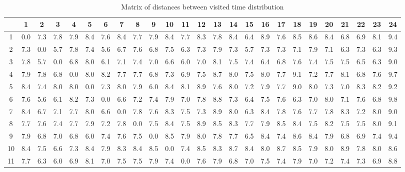 \begin{table}[htbp]
\footnotesize
\setlength{\tabcolsep}{2pt}
\caption{Matrix of distances between visited time distribution}
\label{Table:TimeDistance}
\centering
\begin{tabular}{c|cccccccccccccccccccccccc}
\hline
& 1 & 2 & 3 & 4 & 5 & 6 & 7 & 8 & 9 & 10 & 11 & 12 & 13 & 14 & 15 & 16 & 17 & 18 & 19 & 20 & 21 & 22 & 23 & 24 \\
\hline
1 & 0.0 & 7.3 & 7.8 & 7.9 & 8.4 & 7.6 & 8.4 & 7.7 & 7.9 & 8.4 & 7.7 & 8.3 & 7.8 & 8.4 & 6.4 & 8.9 & 7.6 & 8.5 & 8.6 & 8.4 & 6.8 & 6.9 & 8.1 & 9.4 \\
2 & 7.3 & 0.0 & 5.7 & 7.8 & 7.4 & 5.6 & 6.7 & 7.6 & 6.8 & 7.5 & 6.3 & 7.3 & 7.9 & 7.3 & 5.7 & 7.3 & 7.3 & 7.1 & 7.9 & 7.1 & 6.3 & 7.3 & 6.3 & 9.3 \\
3 & 7.8 & 5.7 & 0.0 & 6.8 & 8.0 & 6.1 & 7.1 & 7.4 & 7.0 & 6.6 & 6.0 & 7.0 & 8.1 & 7.5 & 7.4 & 6.4 & 6.8 & 7.6 & 7.4 & 7.5 & 7.5 & 6.5 & 6.3 & 9.0 \\
4 & 7.9 & 7.8 & 6.8 & 0.0 & 8.0 & 8.2 & 7.7 & 7.7 & 6.8 & 7.3 & 6.9 & 7.5 & 8.7 & 8.0 & 7.5 & 8.0 & 7.7 & 9.1 & 7.2 & 7.7 & 8.1 & 6.8 & 7.6 & 9.7 \\
5 & 8.4 & 7.4 & 8.0 & 8.0 & 0.0 & 7.3 & 8.0 & 7.9 & 6.0 & 8.4 & 8.1 & 8.9 & 7.6 & 8.0 & 7.2 & 7.9 & 7.7 & 9.0 & 8.0 & 7.3 & 7.0 & 8.3 & 8.2 & 9.2 \\
6 & 7.6 & 5.6 & 6.1 & 8.2 & 7.3 & 0.0 & 6.6 & 7.2 & 7.4 & 7.9 & 7.0 & 7.8 & 8.8 & 7.3 & 6.4 & 7.5 & 7.6 & 6.3 & 7.0 & 8.0 & 7.1 & 7.6 & 6.8 & 9.8 \\
7 & 8.4 & 6.7 & 7.1 & 7.7 & 8.0 & 6.6 & 0.0 & 7.8 & 7.6 & 8.3 & 7.5 & 7.3 & 8.9 & 8.0 & 6.3 & 8.4 & 7.8 & 7.6 & 7.7 & 7.8 & 8.3 & 7.2 & 8.0 & 9.0 \\
8 & 7.7 & 7.6 & 7.4 & 7.7 & 7.9 & 7.2 & 7.8 & 0.0 & 7.5 & 8.4 & 7.5 & 8.9 & 8.5 & 8.3 & 7.7 & 7.9 & 8.5 & 8.4 & 7.5 & 8.2 & 7.5 & 7.5 & 8.0 & 9.1 \\
9 & 7.9 & 6.8 & 7.0 & 6.8 & 6.0 & 7.4 & 7.6 & 7.5 & 0.0 & 8.5 & 7.9 & 8.0 & 7.8 & 7.7 & 6.5 & 8.4 & 7.4 & 8.6 & 8.4 & 7.9 & 6.8 & 6.9 & 7.4 & 9.4 \\
10 & 8.4 & 7.5 & 6.6 & 7.3 & 8.4 & 7.9 & 8.3 & 8.4 & 8.5 & 0.0 & 7.4 & 8.5 & 8.3 & 8.7 & 8.4 & 8.0 & 8.7 & 8.5 & 7.9 & 8.0 & 8.9 & 7.8 & 8.0 & 8.6 \\
11 & 7.7 & 6.3 & 6.0 & 6.9 & 8.1 & 7.0 & 7.5 & 7.5 & 7.9 & 7.4 & 0.0 & 7.6 & 7.9 & 6.8 & 7.0 & 7.5 & 7.4 & 7.9 & 7.0 & 7.2 & 7.4 & 7.3 & 6.9 & 8.8 \\

\end{tabular}
\end{table}
